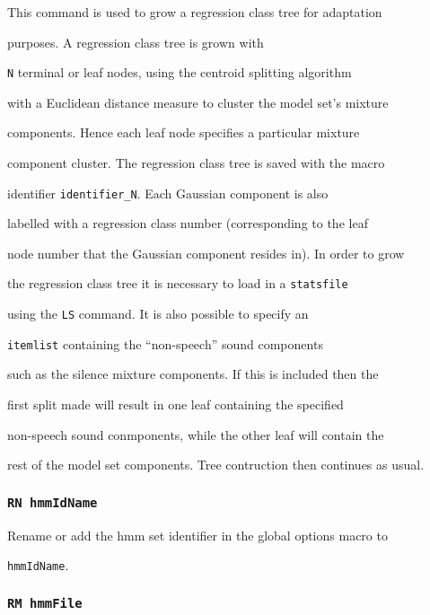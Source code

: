This command is used to grow a regression class tree for adaptation


purposes. A regression class tree is grown with


\texttt{N} terminal or leaf nodes, using the centroid splitting algorithm


with a Euclidean distance measure to cluster the model set's mixture


components. Hence each leaf node specifies a particular mixture


component cluster. The regression class tree is saved with the macro


identifier \texttt{identifier\_N}. Each Gaussian component is also


labelled with a regression class number (corresponding to the leaf


node number that the Gaussian component resides in). In order to grow


the regression class tree it is necessary to load in a \texttt{statsfile}


using the \texttt{LS} command. It is also possible to specify an


\texttt{itemlist} containing the ``non-speech'' sound components 


such as the silence mixture components. If this is included then the


first split made will result in one leaf containing the specified


non-speech sound conmponents, while the other leaf will contain the


rest of the model set components. Tree contruction then continues as usual.





\subsubsection*{\tt RN hmmIdName}





Rename or add the hmm set identifier in the global options macro to 


{\tt hmmIdName}.





\subsubsection*{\tt RM hmmFile}





